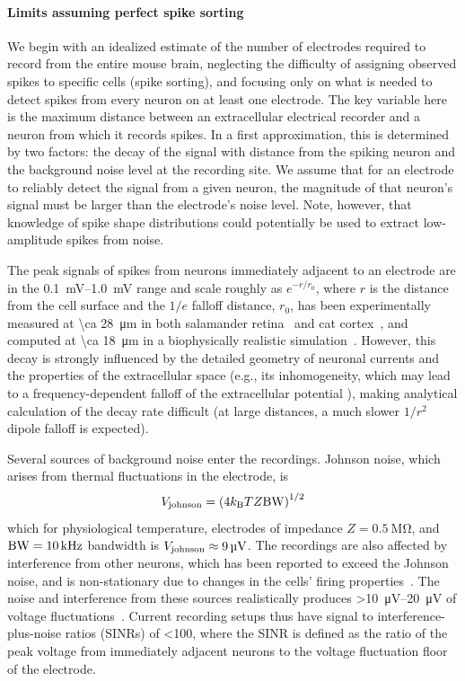 \paragraph{Limits assuming perfect spike sorting}
We begin with an idealized estimate of the number of electrodes required to record from the entire mouse brain, neglecting the difficulty of assigning observed spikes to specific cells (spike sorting), and focusing only on what is needed to detect spikes from every neuron on at least one electrode.  The key variable here is the 
maximum distance between an extracellular electrical recorder and a neuron from which it records spikes.
In a first approximation, this is determined by two factors: the decay of the signal with distance from the spiking neuron and the background noise level at the recording site.
We assume that for an electrode to reliably detect the signal from a given neuron, the magnitude of that neuron's signal must be larger than the electrode's noise level. Note, however, that knowledge of spike shape distributions could potentially be used to extract low-amplitude spikes from noise.

The peak signals of spikes from neurons immediately adjacent to an electrode are in the \SIrange{0.1}{1.0}{\milli\volt} range and scale roughly as $e^{-r/r_0}$, where $r$ is the distance from the cell surface and the $1/e$ falloff distance, $r_0$, has been experimentally measured at \SI{\ca 28}{\micro\meter} in both salamander retina~\cite{segev04} and cat cortex~\cite{gray95}, and computed at \SI{\ca 18}{\micro\meter} in a biophysically realistic simulation~\cite{gold07, anastassiou20132}.
However, this decay is strongly influenced by the detailed geometry of neuronal currents and the properties of the extracellular space (e.g., its inhomogeneity, which may lead to a frequency-dependent falloff of the extracellular potential \cite{bedard2004modeling}), making analytical calculation of the decay rate difficult (at large distances, a much slower $1/r^2$ dipole falloff is expected).

Several sources of background noise enter the recordings.
Johnson noise, which arises from thermal fluctuations in the electrode, is \[V_{\text{\scriptsize johnson}} = \left(4k_{\text{\scriptsize B}} T Z \text{BW}\right)^{1/2}\]
which for physiological temperature, electrodes of impedance $Z = \SI{0.5}{\mega\ohm}$, and $\text{BW} = \SI{10}{\kilo\hertz}$ bandwidth is $V_{\text{\scriptsize johnson}} \approx \SI{9}{\micro\volt}$.
The recordings are also affected by interference from other neurons, which has been reported to exceed the Johnson noise, and is non-stationary due to changes in the cells' firing properties~\cite{sahani99}. 
The noise and interference from these sources realistically produces \SIrange{>10}{20}{\micro\volt} of voltage fluctuations~\cite{camunas13}.
Current recording setups thus have signal to interference-plus-noise ratios (SINRs) of \num{<100}, where the SINR is defined as the ratio of the peak voltage from immediately adjacent neurons to the voltage fluctuation floor of the electrode.

